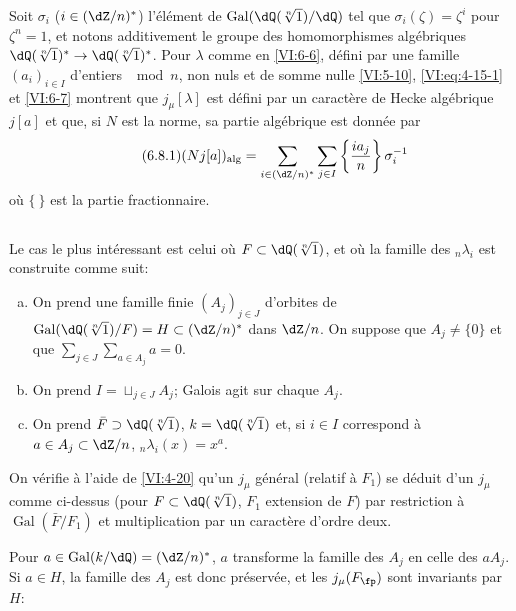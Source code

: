 \documentclass[oneside]{book}
\DeclareMathOperator{\gal}{Gal}
\theoremstyle{sga-source}
\theoremstyle{sga-source-dash}
\theoremstyle{sga-source-dotdash}
\theoremstyle{sga-source-number-note-dash}
\theoremstyle{sga-source-note-number-dotdash}
\theoremstyle{sga-source-example-dotdash}
\theoremstyle{sga-source-inline-number}
\theoremstyle{sga-source-bare-number}
\theoremstyle{sga-source}
\newcommand{\PrintPage}[1]{}\newcommand{\MathPage}[1]{}\newcommand{\PrintCite}[2]{#1}\newcommand{\var}[3]{#2}
\begin{document}
Soit $\sigma_i$ ($i\in (\dZ/n)^\ast$) l'élément de 
$\gal(\dQ(\sqrt[n]{1})/\dQ)$ tel que $\sigma_i(\zeta)=\zeta^i$ pour $\zeta^n=1$, 
et notons additivement le groupe \var{des homomorphisme algébriques}{des homomorphismes algébriques}{S45-SOL-0912} 
$\dQ(\sqrt[n]{1})^\ast \to \dQ(\sqrt[n]{1})^\ast$. Pour $\lambda$ comme en 
\ref{VI:6-6}, défini par une famille $(a_i)_{i\in I}$ d'entiers $\mod n$, non 
nuls et de somme nulle \ref{VI:5-10}, \eqref{VI:eq:4-15-1} et \ref{VI:6-7} 
montrent que $j_\mu[\lambda]$ est défini par un caractère de Hecke 
algébrique $j[a]$ et que, si $N$ est la norme, sa partie algébrique est 
donnée par 
\begin{equation*}\tag{6.8.1}\label{VI:eq:6-8-1}
  (N j[a])_\text{alg} = \sum_{i\in (\dZ/n)^\ast} \sum_{j\in I} \left\{ \frac{i a_j}{n} \right\} \sigma_i^{-1} 
\end{equation*}
où $\{\ \}$ est la partie fractionnaire. 





\subsection{}\label{VI:6-9}

Le cas le plus intéressant est celui où $F\subset \dQ(\sqrt[n]{1})$, et 
où la famille des $_n \lambda_i$ est construite comme suit: 
\begin{enumerate}[a)]
  \item On prend une famille finie $(A_j)_{j\in J}$ d'orbites de 
    $\gal(\dQ(\sqrt[n]{1})/F)=H\subset (\dZ/n)^\ast$ dans $\dZ/n$. On suppose que 
    $A_j\ne\{0\}$ et que $\sum_{j\in J} \sum_{a\in A_j} a=0$. 
  \PrintPage{217}
\item On prend $I=\sqcup_{j\in J} A_j$; Galois agit sur chaque $A_j$. 
  \item On prend $\bar F\supset \dQ(\sqrt[n]{1})$, $k=\dQ(\sqrt[n]{1})$ et, si 
    $i\in I$ correspond à \var{$a\in A_j\subset (\dZ/n)^\ast$}{$a\in A_j\subset\dZ/n$}{S45-ASTRA-S-0037}, 
    $_n\lambda_i(x)=x^a$. 
\end{enumerate}

On vérifie à l'aide de \ref{VI:4-20} qu'un $j_\mu$ général (relatif à 
$F_1$) se déduit d'un $j_\mu$ comme ci-dessus (pour 
$F\subset \dQ(\sqrt[n]{1})$, $F_1$ extension de $F$) par restriction à 
$\gal(\bar F/F_1)$ et multiplication par un caractère d'ordre deux. 

Pour $a\in \gal(k/\dQ)=(\dZ/n)^\ast$, \var{$a$ transformé}{$a$ transforme}{S45-SOL-0919} la famille des $A_j$ 
en celle des $a A_j$. Si $a\in H$, la famille des $A_j$ est donc préservée, 
et les $j_\mu(F_\fp)$ \var{sont invariant par $H$}{sont invariants par $H$}{S45-SOL-0920}: 
\end{document}
